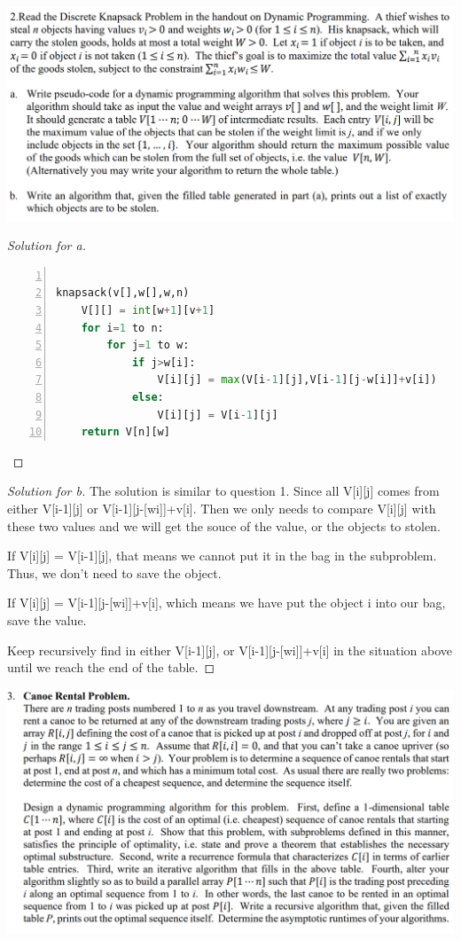 \documentclass[12pt]{article}
\begin{document}
\includegraphics[scale=0.22]{2.png}
\begin{proof}[Solution for a]
	\ \\
	\begin{lstlisting}[language={python},numbers=left,numberstyle=\tiny,%frame=shadowbox,  
		rulesepcolor=\color{red!20!green!20!blue!20},  
		keywordstyle=\color{blue!70!black},  
		commentstyle=\color{blue!90!},  
		basicstyle=\ttfamily]  
		
knapsack(v[],w[],w,n)
	V[][] = int[w+1][v+1]
	for i=1 to n:
		for j=1 to w:
			if j>w[i]:
				V[i][j] = max(V[i-1][j],V[i-1][j-w[i]]+v[i])
			else:
				V[i][j] = V[i-1][j]
	return V[n][w]
	\end{lstlisting}
\end{proof}
\begin{proof}[Solution for b]
	The solution is similar to question 1. Since all V[i][j] comes from either V[i-1][j] or V[i-1][j-[wi]]+v[i]. Then we only needs to compare V[i][j] with these two values and we will get the souce of the value, or the objects to stolen.
	
	If V[i][j] = V[i-1][j], that means we cannot put it in the bag in the subproblem. Thus, we don't need to save the object.
	
	If V[i][j] = V[i-1][j-[wi]]+v[i], which means we have put the object i into our bag, save the value.
	
	Keep recursively find in either V[i-1][j], or V[i-1][j-[wi]]+v[i] in the situation above until we reach the end of the table.
\end{proof}
\includegraphics[scale=0.22]{3.png}
\end{document}
